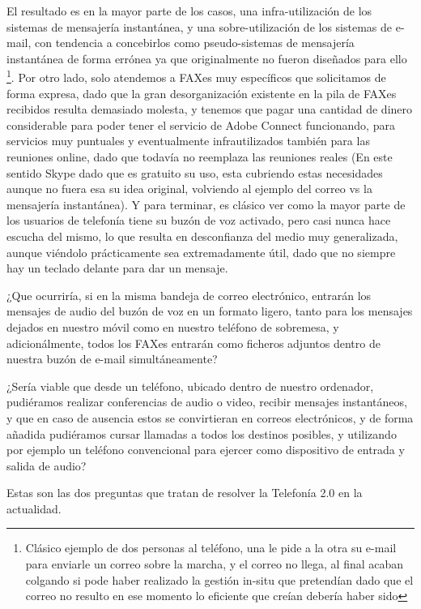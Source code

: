 El resultado es en la mayor parte de los casos, una infra-utilización de los sistemas de mensajería instantánea, y una sobre-utilización de los sistemas de e-mail, con tendencia a concebirlos como pseudo-sistemas de mensajería instantánea de forma errónea ya que originalmente no fueron diseñados para ello \footnote{Clásico ejemplo de dos personas al teléfono, una le pide a la otra su e-mail para enviarle un correo sobre la marcha, y el correo no llega, al final acaban colgando si pode haber realizado la gestión in-situ que pretendían dado que el correo no resulto en ese momento lo eficiente que creían debería haber sido}. Por otro lado, solo atendemos a FAXes muy específicos que solicitamos de forma expresa, dado que la gran desorganización existente en la pila de FAXes recibidos resulta demasiado molesta, y tenemos que pagar una cantidad de dinero considerable para poder tener el servicio de Adobe Connect funcionando, para servicios muy puntuales y eventualmente infrautilizados también para las reuniones online, dado que todavía no reemplaza las reuniones reales (En este sentido Skype dado que es gratuito su uso, esta cubriendo estas necesidades aunque no fuera esa su idea original, volviendo al ejemplo del correo vs la mensajería instantánea). Y para terminar, es clásico ver como la mayor parte de los usuarios de telefonía tiene su buzón de voz activado, pero casi nunca hace escucha del mismo, lo que resulta en desconfianza del medio muy generalizada, aunque viéndolo prácticamente sea extremadamente útil, dado que no siempre hay un teclado delante para dar un mensaje.

¿Que ocurriría, si en la misma bandeja de correo electrónico, entrarán los mensajes de audio del buzón de voz en un formato ligero, tanto para los mensajes dejados en nuestro móvil como en nuestro teléfono de sobremesa, y adicionálmente, todos los FAXes entrarán como ficheros adjuntos dentro de nuestra buzón de e-mail simultáneamente? 

¿Sería viable que desde un teléfono, ubicado dentro de nuestro ordenador, pudiéramos realizar conferencias de audio o video, recibir mensajes instantáneos, y que en caso de ausencia estos se convirtieran en correos electrónicos, y de forma añadida pudiéramos cursar llamadas a todos los destinos posibles, y utilizando por ejemplo un teléfono convencional para ejercer como dispositivo de entrada y salida de audio?

Estas son las dos preguntas que tratan de resolver la Telefonía 2.0 en la actualidad.
